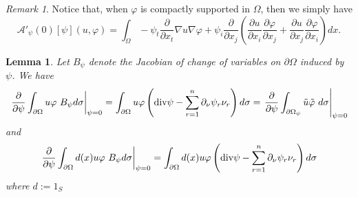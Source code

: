 \documentclass[a4paper,reqno,11pt,oneside]{amsart}
\theoremstyle{plain}
\theoremstyle{plain}
\newtheorem{lemma}[thm]{Lemma}
\theoremstyle{plain}
\theoremstyle{remark}
\newtheorem{remark}[thm]{Remark}
\def\div{\textup{div}}
\begin{document}
\begin{remark}
    Notice that, when $\varphi$ is compactly supported in $\Omega$, then we simply have 
$$
\mathcal{A}'_\psi(0)[\psi](u,\varphi)=
\int_\Omega-\psi_t \frac{\partial}{\partial x_t} \nabla u\nabla \varphi + \psi_i\frac{\partial }{ \partial x_j}\left(\frac{\partial u}{\partial x_i}\frac{\partial \varphi}{\partial x_j}+
\frac{\partial u}{\partial x_j}\frac{\partial \varphi}{\partial x_i}
\right) dx
.$$
    
\end{remark}
\begin{lemma}\label{lem:B}
    Let $B_\psi$ denote the Jacobian of change of variables on $\partial \Omega$ induced by $\psi$. We have 
$$
\left. \frac{\partial}{\partial \psi}\int_{\partial \Omega} u\varphi\ B_\psi d\sigma\right|_{\psi=0}=\int_{\partial \Omega} u\varphi 
\left(
\div \psi -\sum_{r=1}^n %
\partial_\nu \psi_r \nu_r\right)d\sigma=
\left. \frac{\partial}{\partial \psi}\int_{\partial \Omega_\psi} \tilde u
\tilde \varphi\ d\sigma\right|_{\psi=0}
 $$
and
$$
\left. \frac{\partial}{\partial \psi}\int_{\partial \Omega}d(x)  u\varphi\ B_\psi d\sigma\right|_{\psi=0}=\int_{\partial \Omega} d(x)u\varphi
     \left(\div \psi -\sum_{r=1}^n \partial_\nu \psi_r \nu_r\right)d\sigma    
$$where $d:=1_S$
\end{lemma}
\end{document}
